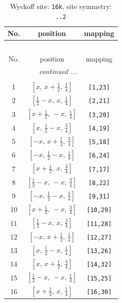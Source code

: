 \documentclass[fleqn,8pt]{jsarticle}
\begin{document}
\begin{longtable}{ccc}
\caption{Wyckoff site: {\tt 16k}, site symmetry: {\tt ..2}}
 \\
 \hline \hline
No. & position & mapping \\ \hline \endfirsthead

\multicolumn{2}{l}{\tablename\ \thetable{}} \\
 \hline \hline
No. & position & mapping \\ \hline \endhead

 \hline \hline
\multicolumn{2}{r}{\footnotesize\it continued ...} \\ \endfoot

 \hline \hline
\multicolumn{2}{r}{} \\ \endlastfoot

1 & $\left[ x,\, x + \frac{1}{2},\, \frac{1}{4} \right]$ & {\tt [1,23]} \\ \hline
2 & $\left[ \frac{1}{2} - x,\, x,\, \frac{1}{4} \right]$ & {\tt [2,21]} \\ \hline
3 & $\left[ x + \frac{1}{2},\, - x,\, \frac{1}{4} \right]$ & {\tt [3,20]} \\ \hline
4 & $\left[ x,\, \frac{1}{2} - x,\, \frac{3}{4} \right]$ & {\tt [4,19]} \\ \hline
5 & $\left[ - x,\, x + \frac{1}{2},\, \frac{3}{4} \right]$ & {\tt [5,18]} \\ \hline
6 & $\left[ - x,\, \frac{1}{2} - x,\, \frac{1}{4} \right]$ & {\tt [6,24]} \\ \hline
7 & $\left[ x + \frac{1}{2},\, x,\, \frac{3}{4} \right]$ & {\tt [7,17]} \\ \hline
8 & $\left[ \frac{1}{2} - x,\, - x,\, \frac{3}{4} \right]$ & {\tt [8,22]} \\ \hline
9 & $\left[ - x,\, \frac{1}{2} - x,\, \frac{3}{4} \right]$ & {\tt [9,31]} \\ \hline
10 & $\left[ x + \frac{1}{2},\, - x,\, \frac{3}{4} \right]$ & {\tt [10,29]} \\ \hline
11 & $\left[ \frac{1}{2} - x,\, x,\, \frac{3}{4} \right]$ & {\tt [11,28]} \\ \hline
12 & $\left[ - x,\, x + \frac{1}{2},\, \frac{1}{4} \right]$ & {\tt [12,27]} \\ \hline
13 & $\left[ x,\, \frac{1}{2} - x,\, \frac{1}{4} \right]$ & {\tt [13,26]} \\ \hline
14 & $\left[ x,\, x + \frac{1}{2},\, \frac{3}{4} \right]$ & {\tt [14,32]} \\ \hline
15 & $\left[ \frac{1}{2} - x,\, - x,\, \frac{1}{4} \right]$ & {\tt [15,25]} \\ \hline
16 & $\left[ x + \frac{1}{2},\, x,\, \frac{1}{4} \right]$ & {\tt [16,30]} \\
\end{longtable}
\end{document}
